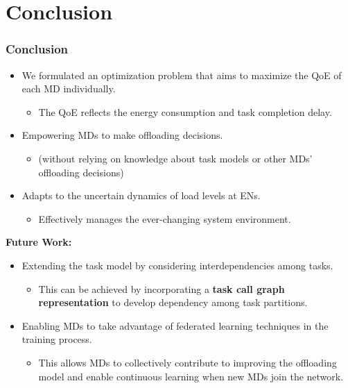 \section{Conclusion}

\begin{frame}
	\frametitle{Conclusion}
	


	\begin{itemize}[]
		
		\item We formulated an optimization problem that aims to maximize the QoE of each MD individually.
		\begin{itemize}
			\item The QoE reflects the energy consumption and task completion delay.
		\end{itemize}
		
		
		\item Empowering MDs to make offloading decisions.
		\begin{itemize}
			\item (without relying on knowledge about task models or other MDs' offloading decisions)
		\end{itemize}
		 
		
		\item  Adapts to the uncertain dynamics of load levels at ENs.
		\begin{itemize}
			\item Effectively manages the ever-changing system environment.
		\end{itemize} 
		
	\end{itemize}

\vfill

	\textbf{Future Work:}

	\begin{itemize}[]
	
	\item Extending the task model by considering interdependencies among tasks. 
	\begin{itemize}
		\item This can be achieved by incorporating a \textbf{task call graph representation} to develop dependency among task partitions.
	\end{itemize}
	
	\item Enabling MDs to take advantage of federated learning techniques in the training process. 
	\begin{itemize}
		\item This allows MDs to collectively contribute to improving the offloading model and enable continuous learning when new MDs join the network.
	\end{itemize}

	
\end{itemize}
	
\end{frame}


